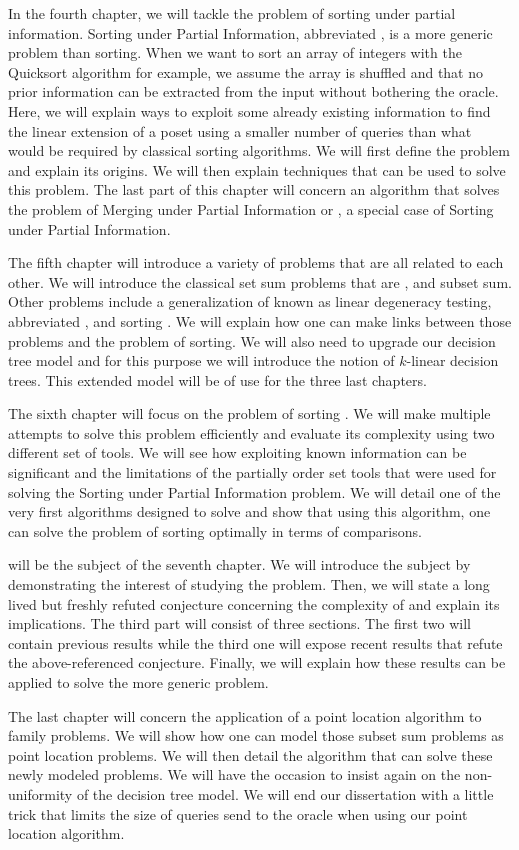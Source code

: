 In the fourth chapter, we will tackle the problem of sorting under partial
information. Sorting under Partial Information, abbreviated , is
a more generic problem than sorting. When we want to sort an array of integers
with the Quicksort algorithm for example, we assume the array is shuffled and
that no prior information can be extracted from the input without bothering the
oracle. Here, we will explain ways to exploit some already existing information
to find the linear extension of a poset using a smaller number of queries than
what would be required by classical sorting algorithms. We will first define
the problem and explain its origins. We will then explain techniques that can
be used to solve this problem. The last part of this chapter will concern an
algorithm that solves the problem of Merging under Partial Information or
, a special case of Sorting under Partial Information.

The fifth chapter will introduce a variety of problems that are all related to
each other. We will introduce the classical set sum problems that are
\threeSUM, \kSUM and subset sum. Other problems include a generalization of
\kSUM known as linear degeneracy testing, abbreviated \kLDT, and sorting \XY.
We will explain how one can make links between those problems and the problem
of sorting. We will also need to upgrade our decision tree model and for this
purpose we will introduce the notion of \(k\)-linear decision trees. This
extended model will be of use for the three last chapters.

The sixth chapter will focus on the problem of sorting \XY. We will make
multiple attempts to solve this problem efficiently and evaluate its complexity
using two different set of tools. We will see how exploiting known information
can be significant and the limitations of the partially order set tools that
were used for solving the Sorting under Partial Information problem. We will
detail one of the very first algorithms designed to solve  and
show that using this algorithm, one can solve the problem of sorting \XY
optimally in terms of comparisons.

\threeSUM will be the subject of the seventh chapter. We will introduce the
subject by demonstrating the interest of studying the \threeSUM problem. Then,
we will state a long lived but freshly refuted conjecture concerning the
complexity of \threeSUM and explain its implications. The third part will
consist of three sections. The first two will contain previous results while
the third one will expose recent results that refute the above-referenced
conjecture. Finally, we will explain how these results can be applied to solve
the more generic \kLDT problem.

The last chapter will concern the application of a point location algorithm to
\kSUM family problems. We will show how one can model those subset sum
problems as point location problems. We will then detail the algorithm that
can solve these newly modeled problems. We will have the occasion to insist again
on the non-uniformity of the decision tree model. We will end our dissertation
with a little trick that limits the size of queries send to the oracle when
using our point location algorithm.
